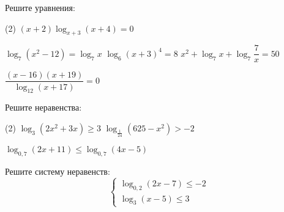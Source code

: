 \begin{consultation}
	\begin{listofex}
		\item Решите уравнения: %
		\begin{tasks}(2)
			\task \( (x+2)\log_{x+3}(x+4)=0 \)
			
			
			\task \( \log_7 (x^2-12)=\log_7 x \)
			\task \( \log_6 (x+3)^4=8 \)
			\task \( x^2+\log_7x+\log_7 \dfrac{ 7 }{  x}=50 \)
			
			\task \( \dfrac{ (x-16)(x+19) }{ \log_{12}(x+17) }=0 \)
		\end{tasks}
		\item Решите неравенства: %
		\begin{tasks}(2)
			\task \( \log_3(2x^2+3x) \ge 3 \)
			\task \( \log_{\tfrac{1}{24}}(625-x^2)>-2 \)
			
			\task \( \log_{0,7}(2x+11)\le \log_{0,7}(4x-5) \)
		\end{tasks}
		\item Решите систему неравенств: %
			\[ \begin{cases} \log_{0,2}(2x-7) \le -2 \\ \log_3 (x-5) \le 3 \end{cases} \]
	\end{listofex}
\end{consultation}
